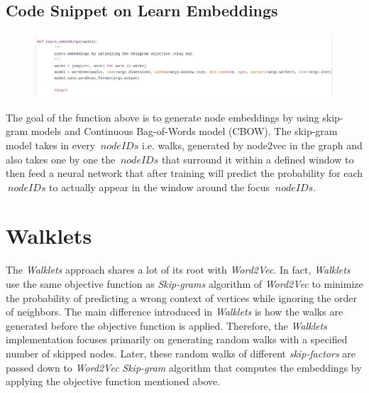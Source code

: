 \documentclass[a4paper,13pt]{article}
\begin{document}
\subsection{Code Snippet on Learn Embeddings}
\begin{figure}[!h]
    \includegraphics[scale=0.35]{screen-shots/embed.jpg}
    \centering
	\label{figuur:opnemer}
    
\end{figure}
\FloatBarrier
The goal of the function above is to generate node embeddings by using skip-gram models and Continuous Bag-of-Words model (CBOW). The skip-gram model takes in every $\ node IDs $ i.e. walks, generated by node2vec in the graph and also takes one by one the $\ node IDs $ that surround it within a defined window to then feed a neural network that after training will predict the probability for each $\ node IDs $ to actually appear in the window around the  focus $\ node IDs $.



\section{Walklets}
The \textit{Walklets} approach shares a lot of its root with \textit{Word2Vec}. In fact, \textit{Walklets} use the same objective function as \textit{Skip-grams} algorithm of \textit{Word2Vec} to minimize the probability of predicting a wrong context of vertices while ignoring the order of neighbors. The main difference introduced in \textit{Walklets} is how the walks are generated before the objective function is applied. Therefore, the \textit{Walklets} implementation focuses primarily on generating random walks with a specified number of skipped nodes. Later, these random walks of different \textit{skip-factors} are passed down to \textit{Word2Vec} \textit{Skip-gram} algorithm that computes the embeddings by applying the objective function mentioned above.\\
\end{document}
